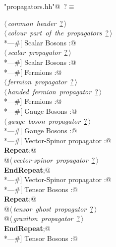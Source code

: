 \documentclass[a4paper,12pt]{amsart}
\renewcommand{\NWtarget}[2]{\hypertarget{#1}{#2}}
\renewcommand{\NWlink}[2]{\hyperlink{#1}{#2}}
\renewcommand{\NWsep}{${\diamond}$}
\begin{document}
\begin{flushleft} \small\label{scrap3}\raggedright\small
\NWtarget{nuweb?}{} \verb@"propagators.hh"@\nobreak\ {\footnotesize {?}}$\equiv$
\vspace{-1ex}
\begin{list}{}{} \item
\mbox{}\verb@@\hbox{$\langle\,${\it common header}\nobreak\ {\footnotesize \NWlink{nuweb?}{?}}$\,\rangle$}\verb@@\\
\mbox{}\verb@@\hbox{$\langle\,${\it colour part of the propagators}\nobreak\ {\footnotesize \NWlink{nuweb?}{?}}$\,\rangle$}\verb@@\\
\mbox{}\verb@*---#[ Scalar Bosons :@\\
\mbox{}\verb@@\hbox{$\langle\,${\it scalar propagator}\nobreak\ {\footnotesize \NWlink{nuweb?}{?}}$\,\rangle$}\verb@@\\
\mbox{}\verb@*---#] Scalar Bosons :@\\
\mbox{}\verb@*---#[ Fermions :@\\
\mbox{}\verb@@\hbox{$\langle\,${\it fermion propagator}\nobreak\ {\footnotesize \NWlink{nuweb?}{?}}$\,\rangle$}\verb@@\\
\mbox{}\verb@@\hbox{$\langle\,${\it handed fermion propagator}\nobreak\ {\footnotesize \NWlink{nuweb?}{?}}$\,\rangle$}\verb@@\\
\mbox{}\verb@*---#] Fermions :@\\
\mbox{}\verb@*---#[ Gauge Bosons :@\\
\mbox{}\verb@@\hbox{$\langle\,${\it gauge boson propagator}\nobreak\ {\footnotesize \NWlink{nuweb?}{?}}$\,\rangle$}\verb@@\\
\mbox{}\verb@*---#] Gauge Bosons :@\\
\mbox{}\verb@*---#[ Vector-Spinor propagator :@\\
\mbox{}\verb@@\hbox{\sffamily\bfseries Repeat}\verb@;@\\
\mbox{}\verb@   @\hbox{$\langle\,${\it vector-spinor propagator}\nobreak\ {\footnotesize \NWlink{nuweb?}{?}}$\,\rangle$}\verb@@\\
\mbox{}\verb@@\hbox{\sffamily\bfseries EndRepeat}\verb@;@\\
\mbox{}\verb@*---#] Vector-Spinor propagator :@\\
\mbox{}\verb@*---#[ Tensor Bosons :@\\
\mbox{}\verb@@\hbox{\sffamily\bfseries Repeat}\verb@;@\\
\mbox{}\verb@   @\hbox{$\langle\,${\it tensor ghost propagator}\nobreak\ {\footnotesize \NWlink{nuweb?}{?}}$\,\rangle$}\verb@@\\
\mbox{}\verb@   @\hbox{$\langle\,${\it graviton propagator}\nobreak\ {\footnotesize \NWlink{nuweb?}{?}}$\,\rangle$}\verb@@\\
\mbox{}\verb@@\hbox{\sffamily\bfseries EndRepeat}\verb@;@\\
\mbox{}\verb@*---#] Tensor Bosons :@\\
\mbox{}\verb@@{\NWsep}
\end{list}
\vspace{-1.5ex}
\footnotesize
\begin{list}{}{\setlength{\itemsep}{-\parsep}\setlength{\itemindent}{-\leftmargin}}


\end{list}
\end{flushleft}
\end{document}
